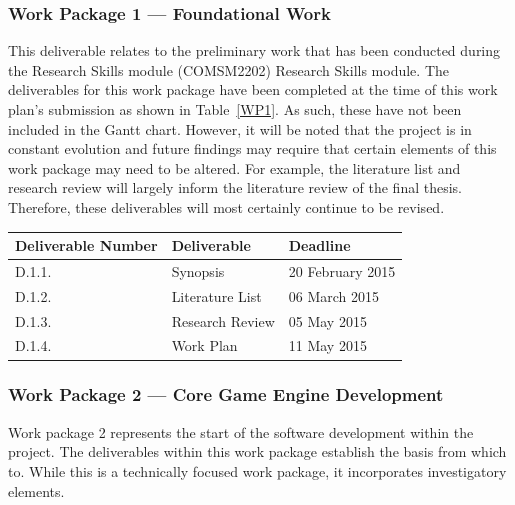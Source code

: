 \documentclass[a4paper]{article}
\begin{document}
\subsubsection{Work Package 1 --- Foundational Work}

This deliverable relates to the preliminary work that has been conducted during the Research Skills
module (COMSM2202) Research Skills module.  The deliverables for this work package have been
completed at the time of this work plan's submission  as shown in Table~\ref{WP1}. As such, these
have not been included in the Gantt chart. However, it will be noted that the project is in constant
evolution and future findings may require that certain elements of this work package may need to be
altered. For example, the literature list and research review will largely inform the literature
review of the final thesis. Therefore, these deliverables will most certainly continue to be
revised.

\begin{center}
    \begin{tabular}{ | l | l | l |}
    \hline
    \rowcolor{Gray}
    Deliverable Number & Deliverable & Deadline \\ \hline

    D.1.1. & Synopsis & 20 February 2015 \\ \hline

    D.1.2. & Literature List & 06 March 2015 \\ \hline

    D.1.3. & Research Review & 05 May 2015 \\ \hline

    D.1.4. & Work Plan & 11 May 2015 \\ \hline

      
    \end{tabular}

\label{WP1}
\end{center}

\subsubsection{Work Package 2 --- Core Game Engine Development}

Work package 2 represents the start of the software development within the project. The deliverables
within this work package establish the basis from which to. While this is a technically focused work
package, it incorporates investigatory elements. 
\end{document}
